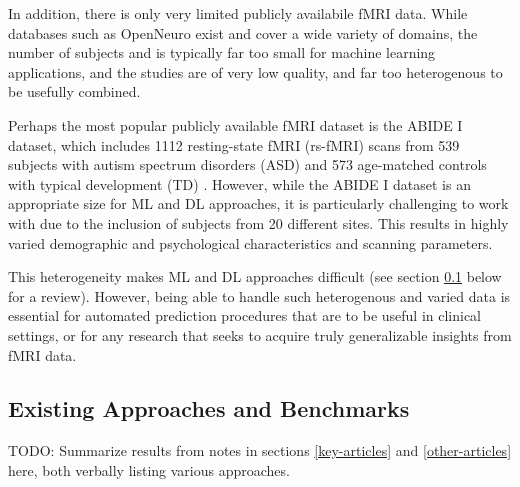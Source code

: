 \documentclass[10pt]{article}
\begin{document}
In addition, there is only very limited publicly availabile fMRI data. While databases such as
OpenNeuro \citep{markiewiczOpenNeuroOpenResource2021} exist and cover a wide variety of domains, the
number of subjects and is typically far too small for machine learning applications, and the studies
are of very  low quality, and far too heterogenous to be usefully combined.

Perhaps the most popular publicly available fMRI dataset is the ABIDE I dataset, which includes 1112
resting-state fMRI (rs-fMRI) scans from 539 subjects with autism spectrum disorders (ASD) and 573
age-matched controls with typical development (TD) \citep{dimartinoAutismBrainImaging2014}. However,
while the ABIDE I dataset is an appropriate size for ML and DL approaches, it is particularly
challenging to work with due to the inclusion of subjects from 20 different sites. This results in
highly varied demographic and psychological characteristics and scanning parameters.

This heterogeneity makes ML and DL approaches difficult (see section \ref{existing-attempts} below
for a review). However, being able to handle such heterogenous and varied data is essential for
automated prediction procedures that are to be useful in clinical settings, or for any research that
seeks to acquire truly generalizable insights from fMRI data.

\subsection{Existing Approaches and Benchmarks} \label{existing-attempts}

TODO: Summarize results from notes in sections \ref{key-articles} and \ref{other-articles} here,
both verbally listing various approaches.
\end{document}
